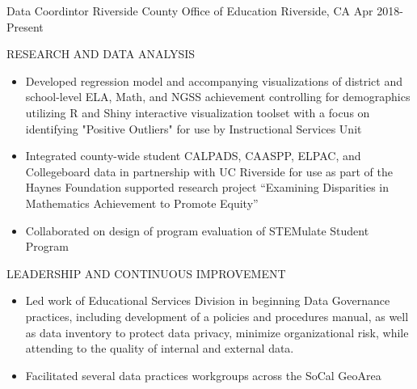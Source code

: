 

\begin{cventries}

  \cventry
    {Data Coordintor} %
    {Riverside County Office of Education} %
    {Riverside, CA} %
    {Apr 2018-Present} %
    {
      \begin{cvitems} %
          \item RESEARCH AND DATA ANALYSIS
          \begin{itemize}
            \item {Developed regression model and accompanying visualizations of
            district and school-level ELA, Math, and NGSS achievement controlling for
            demographics utilizing R and Shiny interactive visualization toolset with
            a focus on identifying "Positive Outliers" for use by Instructional
            Services Unit}
            \item {Integrated county-wide student CALPADS, CAASPP, ELPAC, and
            Collegeboard data in partnership with UC Riverside for use as part of the
            Haynes Foundation supported research project “Examining Disparities in
            Mathematics Achievement to Promote Equity”}
            \item {Collaborated on design of program evaluation of 
            STEMulate Student Program}
          \end{itemize}
          \item LEADERSHIP AND CONTINUOUS IMPROVEMENT
          \begin{itemize}
            \item {Led work of Educational Services Division in beginning Data Governance
            practices, including development of a policies and procedures manual, as well
            as data inventory to protect data privacy, minimize organizational risk, while
            attending to the quality of internal and external data.}
            \item {Facilitated several data practices workgroups across the SoCal GeoArea
}
\end{itemize}
\end{cvitems}}
\end{cventries}
